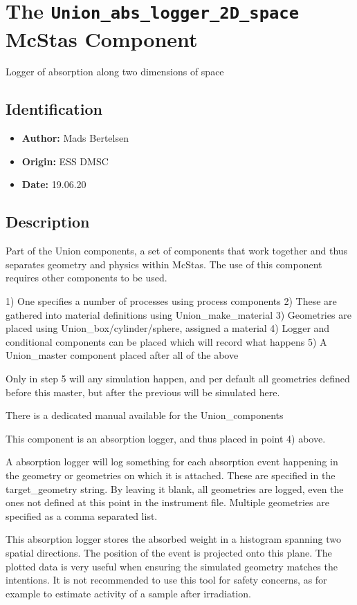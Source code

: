 \section{The \texttt{Union\_abs\_logger\_2D\_space} McStas Component}
Logger of absorption along two dimensions of space

\subsection*{Identification}
\begin{itemize}
  \item \textbf{Author:} Mads Bertelsen
  \item \textbf{Origin:} ESS DMSC
  \item \textbf{Date:} 19.06.20
\end{itemize}

\subsection*{Description}
Part of the Union components, a set of components that work together and thus separates geometry and physics within McStas. The use of this component requires other components to be used.

1) One specifies a number of processes using process components 2) These are gathered into material definitions using Union\_make\_material 3) Geometries are placed using Union\_box/cylinder/sphere, assigned a material 4) Logger and conditional components can be placed which will record what happens 5) A Union\_master component placed after all of the above

Only in step 5 will any simulation happen, and per default all geometries defined before this master, but after the previous will be simulated here.

There is a dedicated manual available for the Union\_components

This component is an absorption logger, and thus placed in point 4) above.

A absorption logger will log something for each absorption event happening in the geometry or geometries on which it is attached. These are specified in the target\_geometry string. By leaving it blank, all geometries are logged, even the ones not defined at this point in the instrument file. Multiple geometries are specified as a comma separated list.

This absorption logger stores the absorbed weight in a histogram spanning two spatial directions. The position of the event is projected onto this plane. The plotted data is very useful when ensuring the simulated geometry matches the intentions. It is not recommended to use this tool for safety concerns, as for example to estimate activity of a sample after irradiation.

